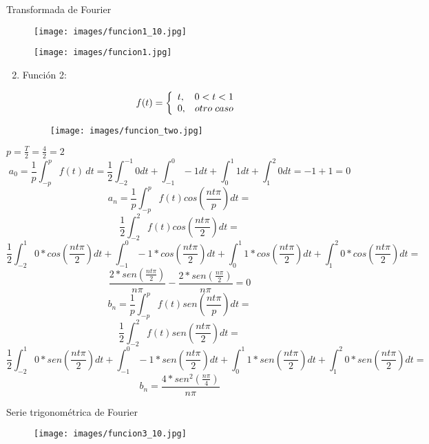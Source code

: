 \documentclass[
	12pt, %
]{fphw}
\begin{document}
\newpage
{\color{teal}
\dotfill
Transformada de Fourier
\dotfill}
\begin{figure}[H]
  \centering
  \texttt{[image: images/funcion1\_10.jpg]}
\end{figure}

\begin{figure}[H]
  \centering
  \texttt{[image: images/funcion1.jpg]}
\end{figure}

\newpage
\begin{enumerate}
  \setcounter{enumi}{1}
\item Función 2:

  \[f(t) =\left\{ \begin{array}{lr}t, & 0 < t < 1 \\0, & otro\hspace{0.1cm} caso \end{array}\right.\]
  
  \begin{figure}[H]
    \centering
    \texttt{[image: images/funcion\_two.jpg]}
  \end{figure}
  
\end{enumerate}

$p=\frac{T}{2}=\frac{4}{2}=2$\\
\dotfill
\[a_{0} = \frac{1}{p}\int_{-p}^{p} f(t) \,dt = \frac{1}{2}\int_{-2}^{-1}0 dt + \int_{-1}^{0}-1 dt + \int_{0}^{1}1 dt + \int_{1}^{2}0 dt =  -1+1 = 0 \]
\dotfill
\[a_{n}=\frac{1}{p}\int_{-p}^{p} f(t) cos(\frac{nt\pi}{p}) dt =\]
\[\frac{1}{2}\int_{-2}^{2} f(t) cos(\frac{nt\pi}{2}) dt =\]
\[\frac{1}{2}\int_{-2}^{1} 0*cos(\frac{nt\pi}{2}) dt + \int_{-1}^{0} -1*cos(\frac{nt\pi}{2}) dt + \int_{0}^{1} 1*cos(\frac{nt\pi}{2}) dt + \int_{1}^{2} 0*cos(\frac{nt\pi}{2}) dt =\]
\[ \frac{2*sen(\frac{nt\pi}{2})}{n\pi} - \frac{2*sen(\frac{n\pi}{2})}{n\pi} = 0\]
\dotfill
\[b_{n}=\frac{1}{p}\int_{-p}^{p} f(t) sen(\frac{nt\pi}{p}) dt =\]
\[\frac{1}{2}\int_{-2}^{2} f(t) sen(\frac{nt\pi}{2}) dt =\]
\[\frac{1}{2}\int_{-2}^{1} 0*sen(\frac{nt\pi}{2}) dt + \int_{-1}^{0} -1*sen(\frac{nt\pi}{2}) dt + \int_{0}^{1} 1*sen(\frac{nt\pi}{2}) dt + \int_{1}^{2} 0*sen(\frac{nt\pi}{2}) dt =\]
\[b_{n}=\frac{4*sen^{2}(\frac{n\pi}{4})}{n\pi}\]

\newpage
{\color{teal}
\dotfill
Serie trigonométrica de Fourier
\dotfill}

\begin{figure}[H]
  \centering
  \texttt{[image: images/funcion3\_10.jpg]}
\end{figure}
\end{document}

